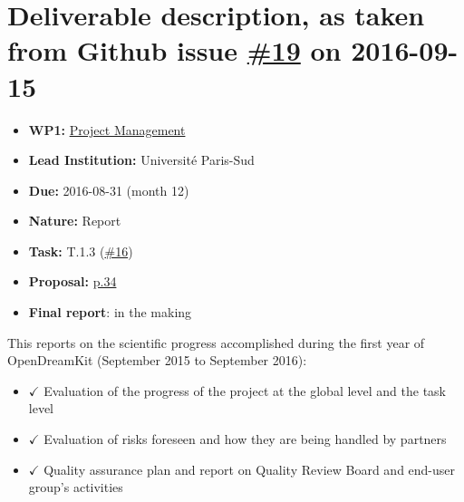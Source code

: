\section*{\texorpdfstring{Deliverable description, as taken from Github
issue
\href{https://github.com/OpenDreamKit/OpenDreamKit/issues/19}{\#19} on
2016-09-15}{Deliverable description, as taken from Github issue \#19 on 2016-09-15}}\label{deliverable-description-as-taken-from-github-issue-19-on-2016-09-15}

\begin{itemize}
\tightlist
\item
  \textbf{WP1:}
  \href{https://github.com/OpenDreamKit/OpenDreamKit/tree/master/WP1}{Project
  Management}
\item
  \textbf{Lead Institution:} Université Paris-Sud
\item
  \textbf{Due:} 2016-08-31 (month 12)
\item
  \textbf{Nature:} Report
\item
  \textbf{Task:} T.1.3
  (\href{https://github.com/OpenDreamKit/OpenDreamKit/issues/16}{\#16})
\item
  \textbf{Proposal:}
  \href{https://github.com/OpenDreamKit/OpenDreamKit/raw/master/Proposal/proposal-www.pdf}{p.34}
\item
  \textbf{Final report}: in the making
\end{itemize}

This reports on the scientific progress accomplished during the first
year of OpenDreamKit (September 2015 to September 2016):

\begin{itemize}
\tightlist
\item
  \(\checkmark\) Evaluation of the progress of the project at the global
  level and the task level
\item
  \(\checkmark\) Evaluation of risks foreseen and how they are being
  handled by partners
\item
  \(\checkmark\) Quality assurance plan and report on Quality Review
  Board and end-user group's activities
\end{itemize}

